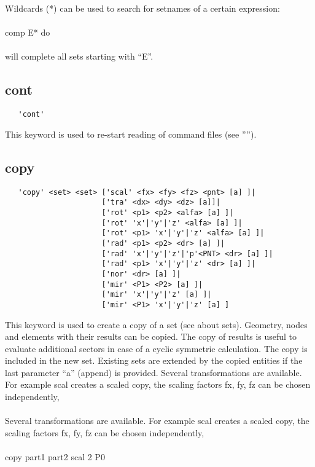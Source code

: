 \documentclass{article}
\begin{document}
Wildcards (*) can be used to search for setnames of a certain expression:\\\\comp E* do\\\\will complete all sets starting with ``E''.

\subsection{\label{cont}cont}
\begin{verbatim}
   'cont'
\end{verbatim}
This keyword is used to re-start reading of command files (see '''').

\subsection{\label{copy}copy}
\begin{verbatim}
   'copy' <set> <set> ['scal' <fx> <fy> <fz> <pnt> [a] ]|
                      ['tra' <dx> <dy> <dz> [a]]|
                      ['rot' <p1> <p2> <alfa> [a] ]|
                      ['rot' 'x'|'y'|'z' <alfa> [a] ]|
                      ['rot' <p1> 'x'|'y'|'z' <alfa> [a] ]|
                      ['rad' <p1> <p2> <dr> [a] ]|
                      ['rad' 'x'|'y'|'z'|'p'<PNT> <dr> [a] ]|
                      ['rad' <p1> 'x'|'y'|'z' <dr> [a] ]|
                      ['nor' <dr> [a] ]|
                      ['mir' <P1> <P2> [a] ]| 
                      ['mir' 'x'|'y'|'z' [a] ]| 
                      ['mir' <P1> 'x'|'y'|'z' [a] ] 
\end{verbatim}
This keyword is used to create a copy of a set (see  about sets). Geometry, nodes and elements with their results can be copied. The copy of results is useful to evaluate additional sectors in case of a cyclic symmetric calculation. The copy is included in the new set. Existing sets are extended by the copied entities if the last parameter ``a'' (append) is provided. Several transformations are available. For example scal creates a scaled copy, the scaling factors fx, fy, fz can be chosen independently,\\\\
Several transformations are available. For example scal creates a scaled copy, the scaling factors fx, fy, fz can be chosen independently,\\\\
copy part1 part2 scal 2 P0 \\
\end{document}
